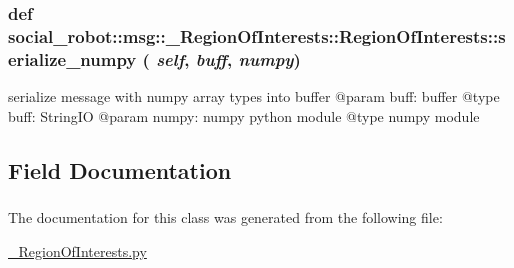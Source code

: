  \hypertarget{classsocial__robot_1_1msg_1_1__RegionOfInterests_1_1RegionOfInterests_aa464213af4d39dd2ad1c1d52f91ea3a2}{
\subsubsection[{serialize\_\-numpy}]{\setlength{\rightskip}{0pt plus 5cm}def social\_\-robot::msg::\_\-RegionOfInterests::RegionOfInterests::serialize\_\-numpy ( {\em self}, \/   {\em buff}, \/   {\em numpy})}}
\label{classsocial__robot_1_1msg_1_1__RegionOfInterests_1_1RegionOfInterests_aa464213af4d39dd2ad1c1d52f91ea3a2}
\begin{DoxyVerb}
serialize message with numpy array types into buffer
@param buff: buffer
@type  buff: StringIO
@param numpy: numpy python module
@type  numpy module
\end{DoxyVerb}
 

\subsection{Field Documentation}
\hypertarget{classsocial__robot_1_1msg_1_1__RegionOfInterests_1_1RegionOfInterests_a89d94e67422a005c044977474b332fef}{
\subsubsection[{rois}]{}}
\label{classsocial__robot_1_1msg_1_1__RegionOfInterests_1_1RegionOfInterests_a89d94e67422a005c044977474b332fef}


The documentation for this class was generated from the following file:\begin{DoxyCompactItemize}
\item 
\hyperlink{__RegionOfInterests_8py}{\_\-RegionOfInterests.py}\end{DoxyCompactItemize}
